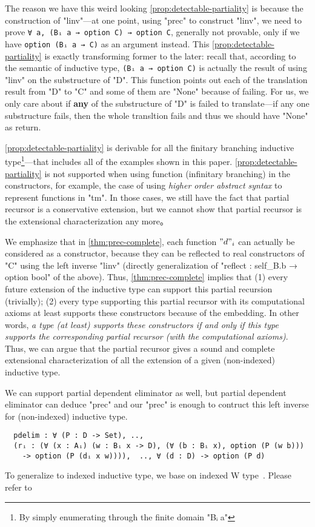 The reason we have this weird looking \ref{prop:detectable-partiality} is because the construction of "linv"---at one point, using "prec" to construct "linv", we need to prove \texttt{∀ a, (Bᵢ a → option C) → option C}, generally not provable, only if we have \texttt{option (Bᵢ a → C)} as an argument instead. This \ref{prop:detectable-partiality} is exactly transforming former to the later: recall that, according to the semantic of inductive type, \texttt{(Bᵢ a → option C)} is actually the result of using "linv" on the substructure of "D". This function points out each of the translation result from "D" to "C" and some of them are "None" because of failing. For us, we only care about if \textbf{any} of the substructure of "D" is failed to translate---if any one substructure fails, then the whole transltion fails and thus we should have "None" as return. 

\ref{prop:detectable-partiality} is derivable for all the finitary branching inductive type\footnote{By simply enumerating through the finite domain "Bᵢ a"}---that includes all of the examples shown in this paper. \ref{prop:detectable-partiality} is not supported when using function (infinitary branching) in the constructors, for example, the case of using \textit{higher order abstract syntax} to represent functions in "tm". In those cases, we still have the fact that partial recursor is a conservative extension, but we cannot show that partial recursor is the extensional characterization any more。


We emphasize that in \cref{thm:prec-complete}, each function $"d"_i$ can
actually be considered as a constructor, because they can be reflected
to real constructors of "C" using the left inverse "linv" (directly generalization of "reflect : self_B.b → option bool" of the above). Thus, \cref{thm:prec-complete}
implies that (1) every future extension of the inductive type can
support this partial recursion (trivially); (2) every type supporting
this partial recursor with its computational axioms at least supports
these constructors because of the embedding. In other words, \textit{a
type (at least) supports these constructors if and only if this type
supports the corresponding partial recursor (with the computational
axioms)}.  Thus, we can argue that the partial recursor gives a sound and
complete extensional characterization of all the extension of a given (non-indexed)
inductive type.

We can support partial dependent eliminator as well, but partial dependent eliminator can deduce "prec" and our "prec" is enough to contruct this left inverse for (non-indexed) inductive type. 
\begin{verbatim}
  pdelim : ∀ (P : D -> Set), .., 
  (rᵢ : (∀ (x : Aᵢ) (w : Bᵢ x -> D), (∀ (b : Bᵢ x), option (P (w b))) 
    -> option (P (dᵢ x w)))),  .., ∀ (d : D) -> option (P d)
\end{verbatim}
To generalize to indexed inductive type, we base on indexed W type~\cite{martin1982constructive, morris2009indexed,jashug2017}. Please refer to 
